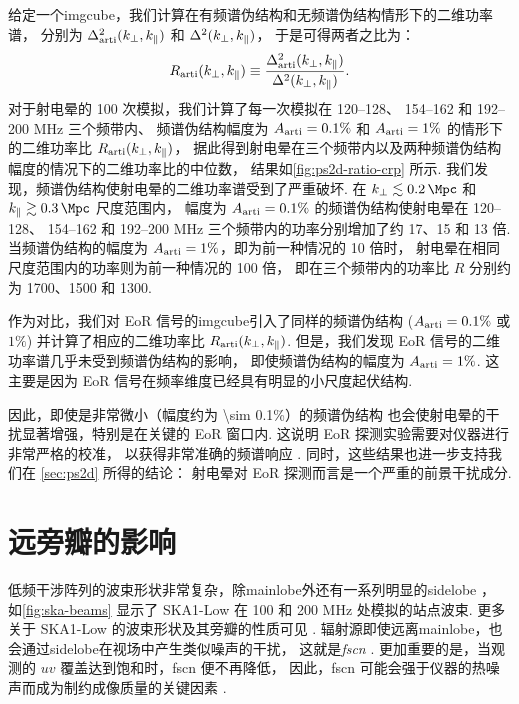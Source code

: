 给定一个\ac{imgcube}，我们计算在有频谱伪结构和无频谱伪结构情形下的二维功率谱，
分别为 $\Delta^2_{\mathrm{arti}}(k_{\perp}, k_{\parallel})$ 和 $\Delta^2(k_{\perp}, k_{\parallel})$，
于是可得两者之比为：
\begin{equation}
  R_{\mathrm{arti}}(k_{\perp}, k_{\parallel})
    \equiv \frac{\Delta^2_{\mathrm{arti}}(k_{\perp}, k_{\parallel})}{
      \Delta^2(k_{\perp}, k_{\parallel})} .
\end{equation}
对于射电晕的 100 次模拟，我们计算了每一次模拟在 \numrange{120}{128}、
\numrange{154}{162} 和 \numrange{192}{200} \si{\MHz} 三个频带内、
频谱伪结构幅度为 $A_{\mathrm{arti}} = 0.1\%$ 和 $A_{\mathrm{arti}} = 1\%$
的情形下的二维功率比 $R_{\mathrm{arti}}(k_{\perp}, k_{\parallel})$，
据此得到射电晕在三个频带内以及两种频谱伪结构幅度的情况下的二维功率比的中位数，
结果如\autoref{fig:ps2d-ratio-crp} 所示.
我们发现，频谱伪结构使射电晕的二维功率谱受到了严重破坏.
在 $\kperp \lesssim \SI{0.2}{\per\Mpc}$ 和
$\klos \gtrsim \SI{0.3}{\per\Mpc}$ 尺度范围内，
幅度为 $A_{\mathrm{arti}} = 0.1\%$ 的频谱伪结构使射电晕在 \numrange{120}{128}、
\numrange{154}{162} 和 \numrange{192}{200} \si{\MHz}
三个频带内的功率分别增加了约 17、15 和 13 倍.
当频谱伪结构的幅度为 $A_{\mathrm{arti}} = 1\%$，即为前一种情况的 10 倍时，
射电晕在相同尺度范围内的功率则为前一种情况的 100 倍，
即在三个频带内的功率比 $R$ 分别约为 1700、1500 和 1300.

作为对比，我们对 EoR 信号的\ac{imgcube}引入了同样的频谱伪结构
($A_{\mathrm{arti}} = 0.1\%$ 或 $1\%$)
并计算了相应的二维功率比 $R_{\mathrm{arti}}(k_{\perp}, k_{\parallel})$.
但是，我们发现 EoR 信号的二维功率谱几乎未受到频谱伪结构的影响，
即使频谱伪结构的幅度为 $A_{\mathrm{arti}} = 1\%$.
这主要是因为 EoR 信号在频率维度已经具有明显的小尺度起伏结构.

因此，即使是非常微小（幅度约为 \num{\sim 0.1}\%）的频谱伪结构
也会使射电晕的干扰显著增强，特别是在关键的 EoR 窗口内.
这说明 EoR 探测实验需要对仪器进行非常严格的校准，
以获得非常准确的频谱响应 \cite{barry2016}.
同时，这些结果也进一步支持我们在 \autoref{sec:ps2d} 所得的结论：
射电晕对 EoR 探测而言是一个严重的前景干扰成分.


\section{远旁瓣的影响}
\label{sec:fscn}

低频干涉阵列的波束形状非常复杂，除\ac{mainlobe}外还有一系列明显的\ac{sidelobe}
\cite{wijnholds2010}，
如\autoref{fig:ska-beams} 显示了 SKA1-Low 在 100 和 200 MHz 处模拟的站点波束.
更多关于 SKA1-Low 的波束形状及其旁瓣的性质可见 .
辐射源即使远离\ac{mainlobe}，也会通过\ac{sidelobe}在视场中产生类似噪声的干扰，
这就是\emph{\acf{fscn}} \cite{smirnov2012}.
更加重要的是，当观测的 $uv$ 覆盖达到饱和时，\ac{fscn} 便不再降低，
因此，\ac{fscn} 可能会强于仪器的热噪声而成为制约成像质量的关键因素 \cite{mort2017}.

